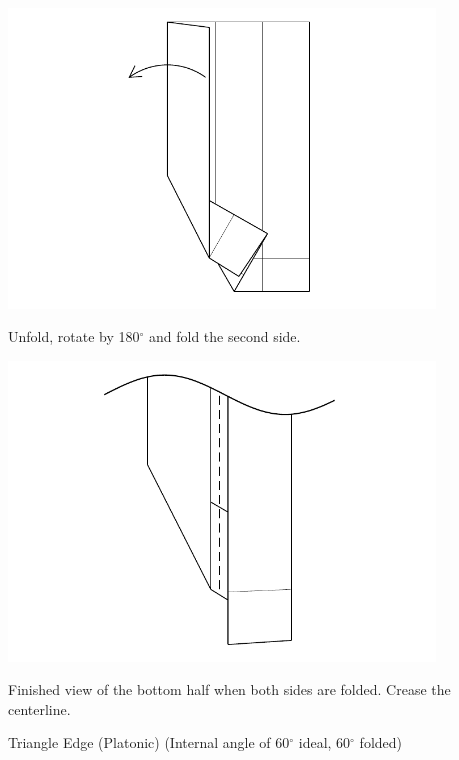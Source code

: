 \documentclass[11pt]{article}
\begin{document}
\begin{minipage}[t]{0.45\textwidth}
  \includegraphics[width=0.85\textwidth]{../figs/fig03b-08}
  \begin{itemize}{\item[8.] Unfold, rotate by 180$^\circ$ and fold the second side.}\end{itemize}
\end{minipage}
\hfill
\begin{minipage}[t]{0.45\textwidth}
  \includegraphics[width=0.85\textwidth]{../figs/fig03b-09}
  \begin{itemize}{\item[9.] Finished view of the bottom half when both sides are folded.  Crease the centerline.}\end{itemize}
\end{minipage}

\newpage
{\Large Triangle Edge} (Platonic) (Internal angle of 60$^\circ$ ideal, 60$^\circ$ folded)
\vspace*{0.25in}
\end{document}
